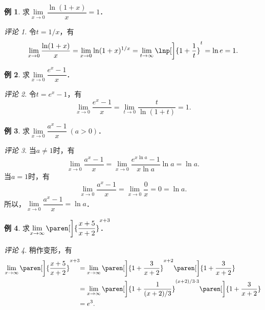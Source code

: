\documentclass[a4paper,punct=CCT]{ctexbook}
\theoremstyle{definition}
\newtheorem*{example*}{例}
\theoremstyle{remark}
\newtheorem*{remark}{评论}
\begin{document}
\begin{example*}
  求\(\lim\limits_{x\to0} \dfrac{\ln(1+x)}{x} = 1\)．\rule{0ex}{3.5ex}

  \begin{remark}
    令\(t = 1/x\)，有
    \begin{equation*}
      \lim_{x\to0} \frac{\ln(1+x)}{x}
      = \lim_{x\to0} \ln(1+x)^{1/x}
      = \lim_{t\to\infty} \lnp[\bigg]{1 + \frac1t}^t
      = \ln e
      = 1.
    \end{equation*}
  \end{remark}
\end{example*}

\begin{example*}
  求\(\lim\limits_{x\to0} \dfrac{e^x-1}{x}\)．

  \begin{remark}
    令\(t = e^x - 1\)，有
    \begin{equation*}
      \lim_{x\to0} \frac{e^x-1}{x}
      = \lim_{t\to0} \frac{t}{\ln(1+t)}
      = 1.
    \end{equation*}
  \end{remark}
\end{example*}

\begin{example*}
  求\(\lim\limits_{x\to0} \dfrac{a^x-1}{x}\ (a > 0)\)．

  \begin{remark}
    当\(a \ne 1\)时，有
    \begin{equation*}
      \lim_{x\to0} \frac{a^x-1}{x}
      = \lim_{x\to0} \frac{e^{x \ln a}-1}{x \ln a} \ln a
      = \ln a.
    \end{equation*}
    当\(a = 1\)时，有
    \begin{equation*}
      \lim_{x\to0} \frac{a^x-1}{x}
      = \lim_{x\to0} \frac{0}{x}
      = 0 = \ln a.
    \end{equation*}
    所以，\(\lim\limits_{x\to0} \dfrac{a^x-1}{x} = \ln a\)．
  \end{remark}
\end{example*}

\begin{example*}
  求\(\lim\limits_{x\to\infty} \paren[\bigg]{\dfrac{x+5}{x+2}}^{\mathrlap{x+3}}\)．

  \begin{remark}
    稍作变形，有
    \begin{align*}
      \lim_{x\to\infty} \paren[\bigg]{\frac{x+5}{x+2}}^{x+3}\negthickspace
      &= \lim_{x\to\infty} \paren[\bigg]{1 + \frac{3}{x+2}}^{x+2} \paren[\bigg]{%
        1 + \frac{3}{x+2}} \\
      &= \lim_{x\to\infty} \paren[\bigg]{1 + \frac{1}{(x+2)/3}}^{(x+2)/3\cdot3} \paren[\bigg]{%
        1 + \frac{3}{x+2}} \\
      &= e^3.
    \end{align*}
  \end{remark}
\end{example*}
\end{document}
